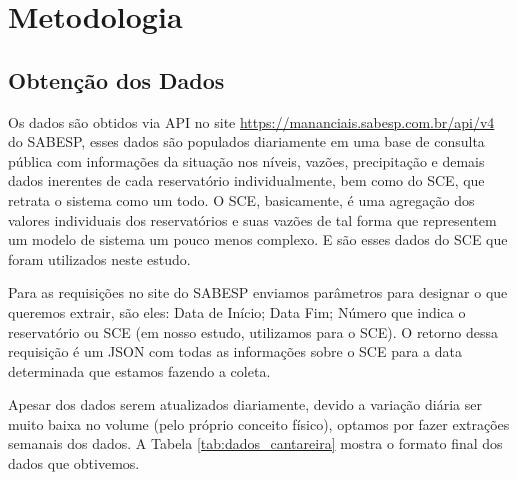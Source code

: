 \chapter{Metodologia}

\section{Obtenção dos Dados} 

Os dados são obtidos via \acrfull{API} no site \url{https://mananciais.sabesp.com.br/api/v4} do \acrshort{SABESP}, esses dados são populados diariamente em uma base de consulta pública com informações da   situação nos níveis, vazões, precipitação e demais dados inerentes de cada reservatório individualmente, bem como do \acrfull{SCE}, que retrata o sistema como um todo. O \acrshort{SCE}, basicamente, é uma agregação dos valores individuais dos reservatórios e suas vazões de tal forma que representem um modelo de sistema um pouco menos complexo. E são esses dados do \acrshort{SCE} que foram utilizados neste estudo.

Para as requisições no site do \acrshort{SABESP} enviamos parâmetros para designar o que queremos extrair, são eles: Data de Início; Data Fim; Número que indica o reservatório ou \acrshort{SCE} (em nosso estudo, utilizamos para o \acrshort{SCE}). O retorno dessa requisição é um \acrfull{JSON} com todas as informações sobre o \acrshort{SCE} para a data determinada que estamos fazendo a coleta.

Apesar dos dados serem atualizados diariamente, devido a variação diária ser muito baixa no volume (pelo próprio conceito físico), optamos por fazer extrações semanais dos dados. A Tabela \ref{tab:dados_cantareira} mostra o formato final dos dados que obtivemos.


